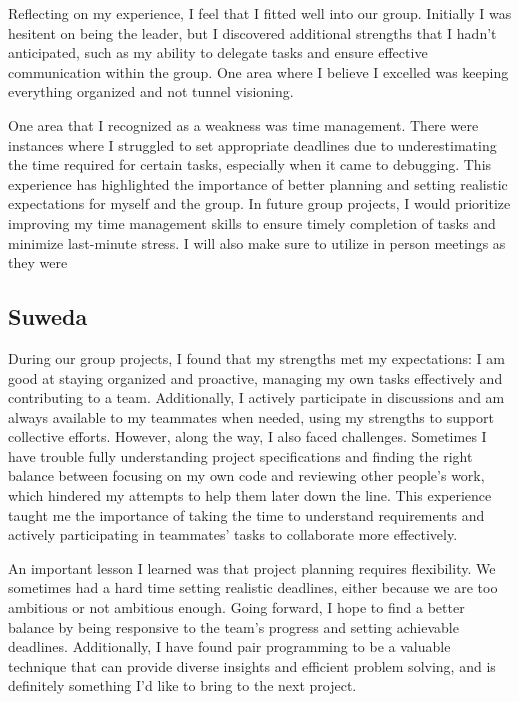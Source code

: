 \documentclass[12pt]{article}
\begin{document}
Reflecting on my experience, I feel that I fitted well into our group. Initially I was hesitent on being the leader, but I discovered additional strengths that I hadn't anticipated, such as my ability to delegate tasks and ensure effective communication within the group.  One area where I believe I excelled was keeping everything organized and not tunnel visioning.  

One area that I recognized as a weakness was time management. There were instances where I struggled to set appropriate deadlines due to underestimating the time required for certain tasks, especially when it came to debugging. This experience has highlighted the importance of better planning and setting realistic expectations for myself and the group. In future group projects, I would prioritize improving my time management skills to ensure timely completion of tasks and minimize last-minute stress. I will also make sure to utilize in person meetings as they were

\subsection{Suweda}

During our group projects, I found that my strengths met my expectations: I am good at staying organized and proactive, managing my own tasks effectively and contributing to a team. Additionally, I actively participate in discussions and am always available to my teammates when needed, using my strengths to support collective efforts. However, along the way, I also faced challenges. Sometimes I have trouble fully understanding project specifications and finding the right balance between focusing on my own code and reviewing other people's work, which hindered my attempts to help them later down the line. This experience taught me the importance of taking the time to understand requirements and actively participating in teammates' tasks to collaborate more effectively.  

An important lesson I learned was that project planning requires flexibility. We sometimes had a hard time setting realistic deadlines, either because we are too ambitious or not ambitious enough. Going forward, I hope to find a better balance by being responsive to the team's progress and setting achievable deadlines. Additionally, I have found pair programming to be a valuable technique that can provide diverse insights and efficient problem solving, and is definitely something I’d like to bring to the next project.  
\end{document}
